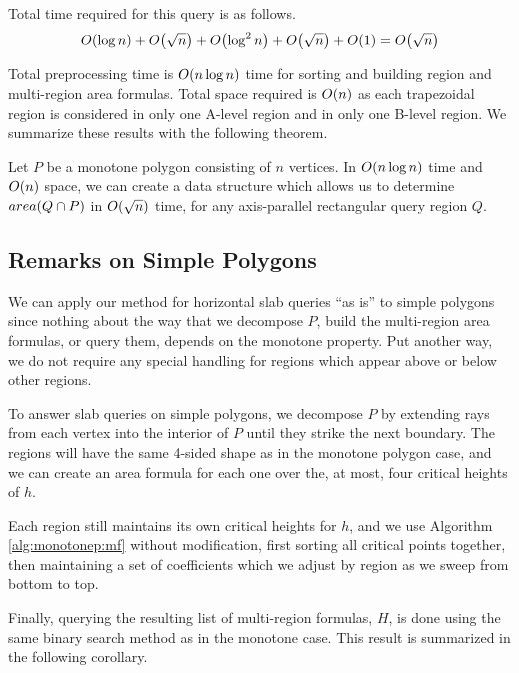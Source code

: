 Total time required for this query is as follows.
\[
O\!\left(\log{n}\right) + O\!\left(\sqrt{n}\right) + O\!\left(\log^2{n}\right) + O\!\left(\sqrt{n}\right) + O\!\left(1\right) = O\!\left(\sqrt{n}\right)
\]

\noindent Total preprocessing time is $O\!\left(n \log{n}\right)$ time for sorting and building region and multi-region area formulas.  
Total space required is $O\!\left(n\right)$ as each trapezoidal region is considered in only one A-level region and in only one B-level region. 
We summarize these results with the following theorem.

\begin{theorem}
\label{th:mono2}
Let $P$ be a monotone polygon consisting of $n$ vertices. 
In $O\!\left(n \log{n}\right)$ time and $O\!\left(n\right)$ space, we can create a data structure which allows us to determine $area(Q \cap P)$ in $O\!\left(\sqrt{n}\right)$ time, for any axis-parallel rectangular query region $Q$.
\end{theorem}


\subsection{Remarks on Simple Polygons}
\label{:monotonep:simplep}

We can apply our method for horizontal slab queries ``as is'' to simple polygons since nothing about the way that we decompose $P$, build the multi-region area formulas, or query them, depends on the monotone property.  Put another way, we do not require any special handling for regions which appear above or below other regions.

To answer slab queries on simple polygons, we decompose $P$ by extending rays from each vertex into the interior of $P$ until they strike the next boundary.  The regions will have the same 4-sided shape as in the monotone polygon case, and we can create an area formula for each one over the, at most, four critical heights of $h$.

Each region still maintains its own critical heights for $h$, and we use Algorithm \ref{alg:monotonep:mf} without modification, first sorting all critical points together, then maintaining a set of coefficients which we adjust by region as we sweep from bottom to top.

Finally, querying the resulting list of multi-region formulas, $H$, is done using the same binary search method as in the monotone case. This result is summarized in the following corollary.

